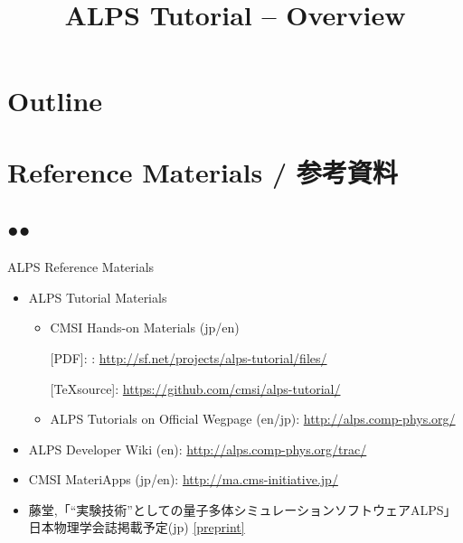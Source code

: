 \title{ALPS Tutorial -- Overview}




\begin{frame}
  \titlepage
\end{frame}

\section*{Outline}
\begin{frame}
  \tableofcontents
\end{frame}

\section{Reference Materials / 参考資料}
\subsection*{{\protect\color{red}●}{\protect\color{blue}●}}

\begin{frame}{ALPS Reference Materials}
  \begin{itemize}
  \item ALPS Tutorial Materials
    \begin{itemize}
    \item CMSI Hands-on Materials (jp/en)
      
      [PDF]: : {\footnotesize \url{http://sf.net/projects/alps-tutorial/files/}}
      
      [\TeX source]: {\footnotesize \url{https://github.com/cmsi/alps-tutorial/}}
      
    \item ALPS Tutorials on Official Wegpage (en/jp): {\footnotesize \url{http://alps.comp-phys.org/}}
    \end{itemize}
  \item ALPS Developer Wiki (en): {\footnotesize \url{http://alps.comp-phys.org/trac/}}
  \item CMSI MateriApps (jp/en): {\footnotesize \url{http://ma.cms-initiative.jp/}}
  \item 藤堂,「``実験技術''としての量子多体シミュレーションソフトウェアALPS」日本物理学会誌掲載予定(jp) \href{http://exa.phys.s.u-tokyo.ac.jp/archive/alps-jps-2015.pdf}{\footnotesize [preprint]}
  \end{itemize}
\end{frame}


